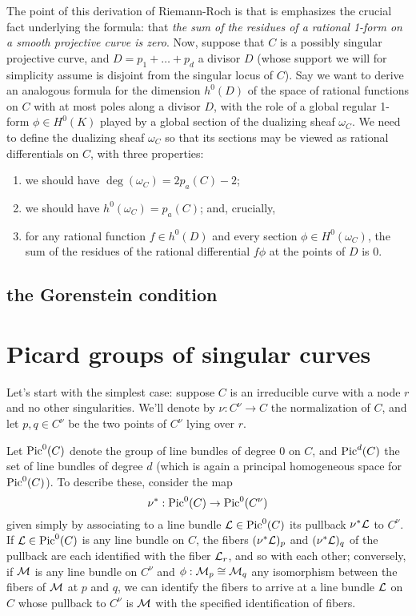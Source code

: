 The point of this derivation of Riemann-Roch is that is emphasizes the crucial fact underlying the formula: that \emph{the sum of the residues of a rational 1-form on a smooth projective curve is zero}. Now, suppose that $C$ is a possibly singular projective curve, and $D = p_1+\dots + p_d$ a divisor $D$ (whose support we will for simplicity assume is disjoint from the singular locus of $C$). Say we want to derive an analogous formula for the dimension $h^0(D)$ of the space of rational functions on $C$ with at most poles along a divisor $D$, with the role of a global regular 1-form $\phi \in H^0(K)$ played by a global section of the dualizing sheaf $\omega_C$. We need to define the dualizing sheaf $\omega_C$ so that its sections may be viewed as rational differentials on $C$, with three properties:

\begin{enumerate}
\item we should have $\deg(\omega_C) = 2p_a(C)-2$;
\item we should have $h^0(\omega_C) = p_a(C)$; and, crucially,
\item for any rational function $f \in h^0(D)$ and every section $\phi \in H^0(\omega_C)$, the sum of the residues of the rational differential $f\phi$ at the points of $D$ is 0.
\end{enumerate}



\subsection{the Gorenstein condition}

\section{Picard groups of singular curves}

Let's start with the simplest case: suppose $C$ is an irreducible curve with a node $r$ and no other singularities. We'll denote by $\nu : C^\nu \to C$ the normalization of $C$, and let $p, q \in C^\nu$ be the two points of $C^\nu$ lying over $r$.

Let $\operatorname{Pic}^0(C)$ denote the group of line bundles of degree 0 on $C$, and $\operatorname{Pic}^d(C)$ the set of line bundles of degree $d$ (which is again a principal homogeneous space for $\operatorname{Pic}^0(C)$). To describe these, consider the map
$$
\nu^* : \operatorname{Pic}^0(C) \to \operatorname{Pic}^0(C^\nu)
$$
given simply by associating to a line bundle ${\mathcal L} \in \operatorname{Pic}^0(C)$ its pullback $\nu^*{\mathcal L}$ to $C^\nu$. If ${\mathcal L} \in \operatorname{Pic}^0(C)$ is any line bundle on $C$, the fibers $(\nu^*{\mathcal L})_p$ and $(\nu^*{\mathcal L})_q$ of the pullback are each identified with the fiber ${\mathcal L}_r$, and so with each other; conversely, if ${\mathcal M}$ is any line bundle on $C^\nu$ and $\phi : {\mathcal M}_p \cong {\mathcal M}_q$ any isomorphism between the fibers of ${\mathcal M}$ at $p$ and $q$, we can identify the fibers to arrive at a line bundle ${\mathcal L}$ on $C$ whose pullback to $C^\nu$ is ${\mathcal M}$ with the specified identification of fibers.

